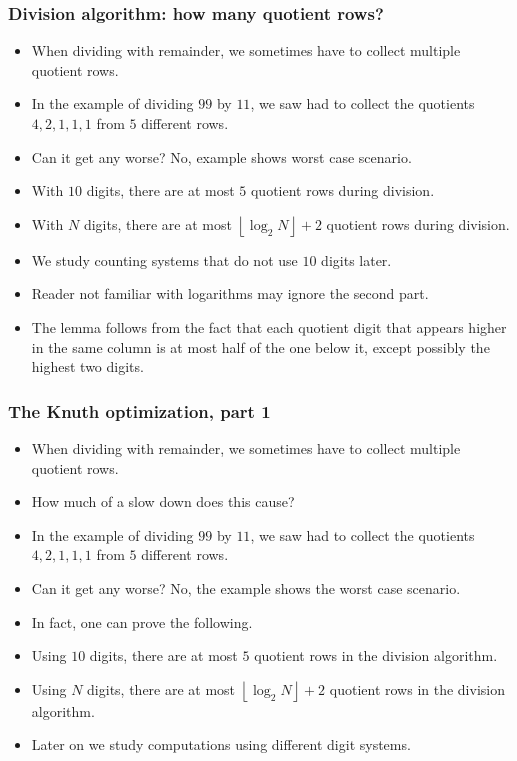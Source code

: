 \begin{frame}
\frametitle{Division algorithm: how many quotient rows?}
\begin{itemize}
\item When dividing with remainder, we sometimes have to collect multiple quotient rows.
\item In the example of dividing $99$ by $11$, we saw had to collect the quotients $4,2,1,1,1$ from $5$ different rows.
\item Can it get any worse? No, example shows worst case scenario.
\end{itemize}
\begin{lemma}
\begin{itemize}
\item With $10$ digits, there are at most $5$ quotient rows during division.
\item \color{gray} With $N$ digits, there are at most $\left\lfloor \log_2 N\right\rfloor + 2$ quotient rows during division.
\end{itemize}
\end{lemma}
\begin{itemize}
\item We study counting systems that do not use $10$ digits later.
\item Reader not familiar with logarithms may ignore the second part.
\item The lemma follows from the fact that each quotient digit that appears higher in the same column is at most half of the one below it, except possibly the highest two digits.
\end{itemize}

\end{frame}

\begin{frame}
\frametitle{The Knuth optimization, part 1}
\begin{itemize}
\item When dividing with remainder, we sometimes have to collect multiple quotient rows.
\item How much of a slow down does this cause?
\item In the example of dividing $99$ by $11$, we saw had to collect the quotients $4,2,1,1,1$ from $5$ different rows.
\item Can it get any worse? No, the example shows the worst case scenario.
\item In fact, one can prove the following.
\end{itemize}
\begin{lemma}
\begin{itemize}
\item Using $10$ digits, there are at most $5$ quotient rows in the division algorithm.
\item Using $N$ digits, there are at most $\left\lfloor \log_2 N\right\rfloor + 2$ quotient rows in the division algorithm.
\end{itemize}
\end{lemma}
\begin{itemize}
\item Later on we study computations using different digit systems.
\end{itemize}

\end{frame}